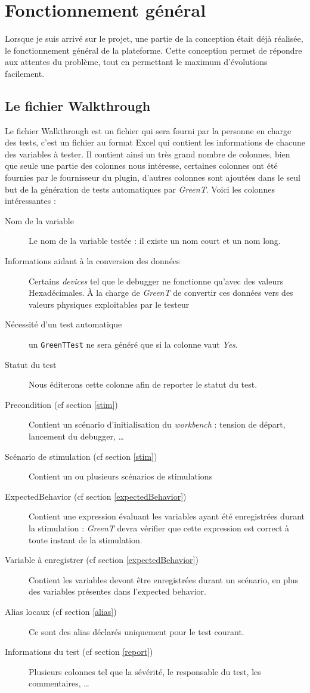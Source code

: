 	\section{Fonctionnement général}
	Lorsque je suis arrivé sur le projet, une partie de la conception était déjà réalisée, le fonctionnement général de la plateforme. Cette conception permet de répondre aux attentes du problème, tout en permettant le maximum d'évolutions facilement.
	
	\subsection{Le fichier Walkthrough}\label{wt}
		Le fichier Walkthrough est un fichier qui sera fourni par la personne en charge des tests, c'est un fichier au format Excel qui contient les informations
		de chacune des variables à tester. Il contient ainsi un très grand nombre de colonnes, bien que seule une partie des colonnes nous intéresse, certaines colonnes ont été fournies par le fournisseur du plugin, d'autres colonnes sont ajoutées dans le seul but de la génération de tests automatiques par \textit{GreenT}. Voici les colonnes intéressantes : 

		\begin{description} 
			\item[Nom de la variable] Le nom de la variable testée : il existe un nom court et un nom long.
			\item[Informations aidant à la conversion des données] Certains \textit{devices} tel que le debugger ne fonctionne qu'avec des valeurs Hexadécimales. À la charge de \textit{GreenT} de convertir ces données vers des valeurs physiques exploitables par le testeur
			\item[Nécessité d'un test automatique] un \texttt{GreenTTest} ne sera généré que si la colonne vaut \textit{Yes}.
			\item[Statut du test] Nous éditerons cette colonne afin de reporter le statut du test.
			\item[Precondition (cf section \ref{stim})] Contient un scénario d'initialisation du \textit{workbench} : tension de départ, lancement du debugger, \ldots
			\item[Scénario de stimulation (cf section \ref{stim})] Contient un ou plusieurs scénarios de stimulations
			\item[ExpectedBehavior (cf section \ref{expectedBehavior})] Contient une expression évaluant les variables ayant été enregistrées durant la stimulation : \textit{GreenT} devra vérifier que cette expression est correct à toute instant de la stimulation.
			\item[Variable à enregistrer (cf section \ref{expectedBehavior})] Contient les variables devont être enregistrées durant un scénario, en plus des variables présentes dans l'expected behavior.
			\item[Alias locaux (cf section \ref{alias})] Ce sont des alias déclarés uniquement pour le test courant.
			\item[Informations du test (cf section \ref{report})] Plusieurs colonnes tel que la sévérité, le responsable du test, les commentaires, \ldots
		\end{description}


